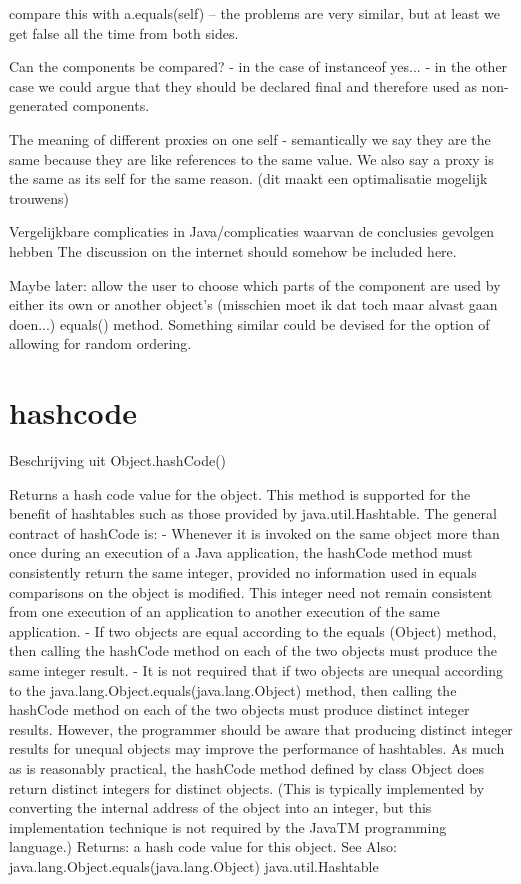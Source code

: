 \documentclass[a4paper,12pt]{book}
\begin{document}
compare this with a.equals(self) -- the problems are very similar, but at least we get false all the time from both sides.

Can the components be compared?
 - in the case of instanceof yes...
 - in the other case we could argue that they should be declared final and therefore used as  non-generated components.

 
The meaning of different proxies on one self - semantically we say they are the same because they are like references to the same value. We also say a proxy is the same as its self for the same reason. (dit maakt een optimalisatie mogelijk trouwens)


Vergelijkbare complicaties in Java/complicaties waarvan de conclusies gevolgen hebben 
The discussion on the internet should somehow be included here.

Maybe later: allow the user to choose which parts of the component are used by either its own or another object's (misschien moet ik dat toch maar alvast gaan doen...) equals() method. Something similar could be devised for the option of allowing for random ordering.

\section*{hashcode}

Beschrijving uit Object.hashCode()

Returns a hash code value for the object. This method is supported for the benefit of hashtables such as those provided by java.util.Hashtable. The general contract of hashCode is: - Whenever it is invoked on the same object more than once during an execution of a Java application, the hashCode method must consistently return the same integer, provided no information used in equals comparisons on the object is modified. This integer need not remain consistent from one execution of an application to another execution of the same application. - If two objects are equal according to the equals (Object) method, then calling the hashCode method on each of the two objects must produce the same integer result. - It is not required that if two objects are unequal according to the java.lang.Object.equals(java.lang.Object) method, then calling the hashCode method on each of the two objects must produce distinct integer results. However, the programmer should be aware that producing distinct integer results for unequal objects may improve the performance of hashtables.  As much as is reasonably practical, the hashCode method defined by class Object does return distinct integers for distinct objects. (This is typically implemented by converting the internal address of the object into an integer, but this implementation technique is not required by the JavaTM programming language.) Returns: a hash code value for this object. See Also: java.lang.Object.equals(java.lang.Object) java.util.Hashtable
\end{document}
